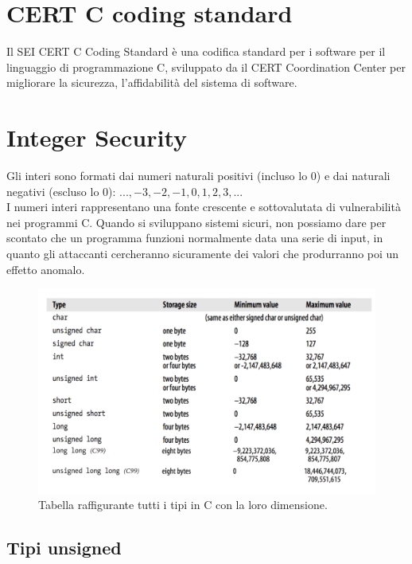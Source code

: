 \section{CERT C coding standard}

Il SEI CERT C Coding Standard è una codifica standard per i software per il
linguaggio di programmazione C, sviluppato da il CERT Coordination Center per
migliorare la sicurezza, l'affidabilità del sistema di software.

\section{Integer Security}

Gli interi sono formati dai numeri naturali positivi (incluso lo 0) e dai naturali
negativi (escluso lo 0): $..., -3, -2, -1, 0, 1, 2, 3, ...$\\
I numeri interi rappresentano una fonte crescente e sottovalutata di vulnerabilità
nei programmi C. Quando si sviluppano sistemi sicuri, non possiamo dare per scontato
che un programma funzioni normalmente data una serie di input,
in quanto gli attaccanti cercheranno sicuramente dei valori che produrranno
poi un effetto anomalo.

\begin{figure}[H]
    \centering
    \includegraphics[width=13cm, keepaspectratio]{capitoli/secure_coding/img/cap_2/vari_tipi.png}
    \caption{Tabella raffigurante tutti i tipi in C con la loro dimensione.}\label{fig:vari_tipi}
\end{figure}

\subsection{Tipi unsigned}

